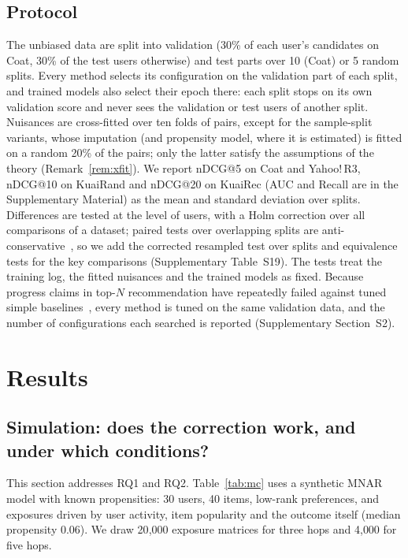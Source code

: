 \documentclass[preprint,review,12pt,authoryear]{elsarticle}
\theoremstyle{definition}
\begin{document}
\subsection{Protocol}\label{sec:protocol}

The unbiased data are split into validation (30\% of each user's candidates on
Coat, 30\% of the test users otherwise) and test parts over 10 (Coat) or 5 random
splits. Every method selects its configuration on the validation part of each
split, and trained models also select their epoch there: each split stops on its
own validation score and never sees the validation or test users of another split.
Nuisances are cross-fitted over ten folds of pairs, except for the sample-split
variants, whose imputation (and propensity model, where it is estimated) is fitted
on a random 20\% of the pairs; only the latter satisfy the assumptions of the
theory (Remark~\ref{rem:xfit}). We report nDCG@5 on Coat and Yahoo!\,R3, nDCG@10
on KuaiRand and nDCG@20 on KuaiRec (AUC and Recall are in the Supplementary
Material) as the mean and standard deviation over splits. Differences are tested
at the level of users, with a Holm correction over all comparisons of a dataset;
paired tests over overlapping splits are anti-conservative~\citep{nadeau2003}, so
we add the corrected resampled test over splits and equivalence tests for the
key comparisons (Supplementary Table~S19). The tests treat the training log,
the fitted nuisances and the trained models as fixed. Because progress claims in
top-$N$ recommendation have repeatedly failed against tuned simple
baselines~\citep{dacrema2019progress,rendle2019baselines,anelli2023myth}, every
method is tuned on the same validation data, and the number of configurations
each searched is reported (Supplementary Section~S2).


\section{Results}\label{sec:results}

\subsection{Simulation: does the correction work, and under which conditions?}\label{sec:mc}

This section addresses RQ1 and RQ2. Table~\ref{tab:mc} uses a synthetic MNAR model
with known propensities: 30 users, 40 items, low-rank preferences, and exposures
driven by user activity, item popularity and the outcome itself (median
propensity 0.06). We draw 20{,}000 exposure matrices for three hops and 4{,}000 for
five hops.
\end{document}
